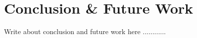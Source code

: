 \setcounter{secnumdepth}{5}
\chapter{Conclusion \& Future Work}
\thispagestyle{empty}
\glsresetall
\label{Chapter5}


Write about conclusion and future work here ............